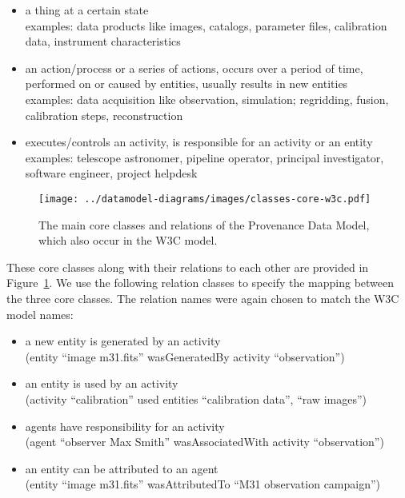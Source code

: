 \begin{itemize}
\item {} a thing at a certain state\\
    examples: data products like images, catalogs, parameter files, calibration data, instrument characteristics

\item {} an action/process or a series of actions, occurs over a period of time, performed on or caused by entities, usually results in new entities\\
    examples: data acquisition like observation, simulation; regridding, fusion, calibration steps, reconstruction

\item {} executes/controls an activity, is responsible for an activity or an entity\\
    examples: telescope astronomer, pipeline operator, principal investigator, software engineer, project helpdesk

\end{itemize}

\noindent



\begin{figure}[h]
\centering
\texttt{[image: ../datamodel-diagrams/images/classes-core-w3c.pdf]}
\caption{The main core classes and relations of the Provenance Data Model, which also occur in the W3C model.}
\label{fig:coreclasses}
\end{figure}

These core classes along with their relations to each other are provided in Figure~\ref{fig:coreclasses}.
We use the following relation classes to specify the mapping between the three core 
classes. 
The relation names were again chosen to match the W3C model names:
\begin{itemize}
\item {} a new entity is generated by an activity\\
        (entity ``image m31.fits'' wasGeneratedBy activity ``observation'')
\item {} an entity is used by an activity\\
        (activity ``calibration'' used entities ``calibration data'', ``raw images'')
\item {} agents have responsibility for an activity\\
        (agent ``observer Max Smith'' wasAssociatedWith activity ``observation'')
\item {} an entity can be attributed to an agent\\
        (entity ``image m31.fits'' wasAttributedTo ``M31 observation campaign'')
\end{itemize}

